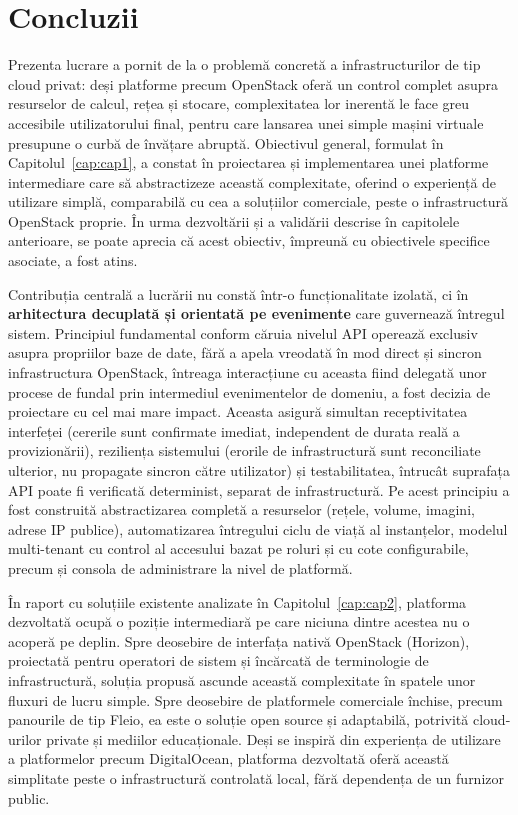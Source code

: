 \chapter{Concluzii}
\label{cap:cap5}

Prezenta lucrare a pornit de la o problemă concretă a infrastructurilor de tip cloud privat: deși platforme precum OpenStack oferă un control complet asupra resurselor de calcul, rețea și stocare, complexitatea lor inerentă le face greu accesibile utilizatorului final, pentru care lansarea unei simple mașini virtuale presupune o curbă de învățare abruptă. Obiectivul general, formulat în Capitolul~\ref{cap:cap1}, a constat în proiectarea și implementarea unei platforme intermediare care să abstractizeze această complexitate, oferind o experiență de utilizare simplă, comparabilă cu cea a soluțiilor comerciale, peste o infrastructură OpenStack proprie. În urma dezvoltării și a validării descrise în capitolele anterioare, se poate aprecia că acest obiectiv, împreună cu obiectivele specifice asociate, a fost atins.

Contribuția centrală a lucrării nu constă într-o funcționalitate izolată, ci în \textbf{arhitectura decuplată și orientată pe evenimente} care guvernează întregul sistem. Principiul fundamental conform căruia nivelul API operează exclusiv asupra propriilor baze de date, fără a apela vreodată în mod direct și sincron infrastructura OpenStack, întreaga interacțiune cu aceasta fiind delegată unor procese de fundal prin intermediul evenimentelor de domeniu, a fost decizia de proiectare cu cel mai mare impact. Aceasta asigură simultan receptivitatea interfeței (cererile sunt confirmate imediat, independent de durata reală a provizionării), reziliența sistemului (erorile de infrastructură sunt reconciliate ulterior, nu propagate sincron către utilizator) și testabilitatea, întrucât suprafața API poate fi verificată determinist, separat de infrastructură. Pe acest principiu a fost construită abstractizarea completă a resurselor (rețele, volume, imagini, adrese IP publice), automatizarea întregului ciclu de viață al instanțelor, modelul multi-tenant cu control al accesului bazat pe roluri și cu cote configurabile, precum și consola de administrare la nivel de platformă.

În raport cu soluțiile existente analizate în Capitolul~\ref{cap:cap2}, platforma dezvoltată ocupă o poziție intermediară pe care niciuna dintre acestea nu o acoperă pe deplin. Spre deosebire de interfața nativă OpenStack (Horizon), proiectată pentru operatori de sistem și încărcată de terminologie de infrastructură, soluția propusă ascunde această complexitate în spatele unor fluxuri de lucru simple. Spre deosebire de platformele comerciale închise, precum panourile de tip Fleio, ea este o soluție open source și adaptabilă, potrivită cloud-urilor private și mediilor educaționale. Deși se inspiră din experiența de utilizare a platformelor precum DigitalOcean, platforma dezvoltată oferă această simplitate peste o infrastructură controlată local, fără dependența de un furnizor public.

